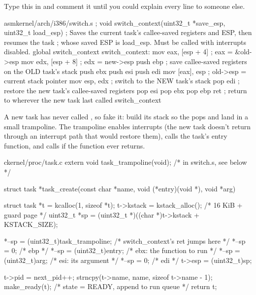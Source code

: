 \documentclass[11pt,a4paper]{article}
\begin{document}
Type this in and comment it until you could explain every line to someone else.

\begin{lst}{asm}{kernel/arch/i386/switch.s}
; void switch_context(uint32_t *save_esp, uint32_t load_esp)
; Saves the current task's callee-saved registers and ESP, then resumes the task
; whose saved ESP is load_esp. Must be called with interrupts disabled.
global switch_context
switch_context:
    mov  eax, [esp + 4]     ; eax = &old->esp
    mov  edx, [esp + 8]     ; edx = new->esp
    push ebp                ; save callee-saved registers on the OLD task's stack
    push ebx
    push esi
    push edi
    mov  [eax], esp         ; old->esp = current stack pointer
    mov  esp, edx           ; switch to the NEW task's stack
    pop  edi                ; restore the new task's callee-saved registers
    pop  esi
    pop  ebx
    pop  ebp
    ret                     ; return to wherever the new task last called switch_context
\end{lst}

A new task has never called , so fake it: build its stack so the pops and  land in a
small trampoline. The trampoline enables interrupts (the new task doesn't return through an interrupt path that
would restore them), calls the task's entry function, and calls  if the function ever returns.

\begin{lst}{c}{kernel/proc/task.c}
extern void task_trampoline(void);          /* in switch.s, see below */

struct task *task_create(const char *name, void (*entry)(void *), void *arg)
{
    struct task *t = kcalloc(1, sizeof *t);
    t->kstack = kstack_alloc();             /* 16 KiB + guard page */
    uint32_t *sp = (uint32_t *)((char *)t->kstack + KSTACK_SIZE);

    *--sp = (uint32_t)task_trampoline;      /* switch_context's ret jumps here */
    *--sp = 0;                              /* ebp                             */
    *--sp = (uint32_t)entry;                /* ebx: the function to run        */
    *--sp = (uint32_t)arg;                  /* esi: its argument               */
    *--sp = 0;                              /* edi                             */
    t->esp = (uint32_t)sp;

    t->pid = next_pid++;
    strncpy(t->name, name, sizeof t->name - 1);
    make_ready(t);                          /* state = READY, append to run queue */
    return t;
}
\end{lst}
\end{document}
